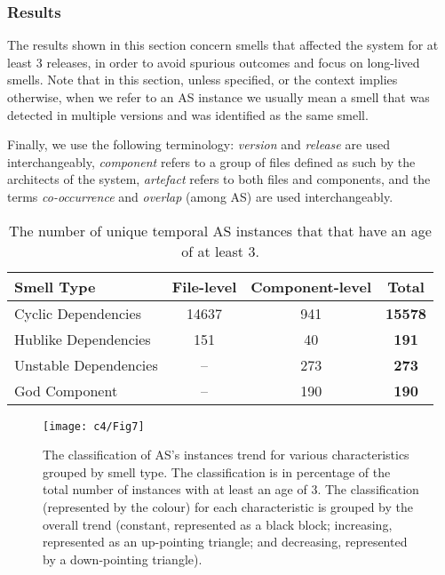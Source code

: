 \subsubsection{Results}\label{c4:sec:results-rq1.1}
The results shown in this section concern smells that affected the system for at least 3 releases, in order to avoid spurious outcomes and focus on long-lived smells. Note that in this section, unless specified, or the context implies otherwise, when we refer to an AS instance we usually mean a smell that was detected in multiple versions and was identified as the same smell.

Finally, we use the following terminology: \emph{version} and \emph{release} are used interchangeably, \emph{component} refers to a group of files defined as such by the architects of the system, \emph{artefact} refers to both files and components, and the terms \emph{co-occurrence} and \emph{overlap} (among AS) are used interchangeably.

\begin{table}[tbp]
    \centering
    \caption{The number of unique temporal AS instances that that have an age of at least 3.}
    \label{c4:tab:smell-count}
    \begin{tabular}{@{}lcc|c@{}}
    \toprule
    \textbf{Smell Type} & \textbf{File-level} & \textbf{Component-level} & \textbf{Total} \\ \midrule
    Cyclic Dependencies & 14637 & 941 & \textbf{15578} \\
    Hublike Dependencies & 151 & 40 & \textbf{191} \\
    Unstable Dependencies & -- & 273 & \textbf{273} \\
    God Component & -- & 190 & \textbf{190} \\ \bottomrule
    \end{tabular}
\end{table}

\begin{figure}[h]
    \centering
    \texttt{[image: c4/Fig7]}
    \caption{The classification of AS's instances trend for various characteristics grouped by smell type. The classification is in percentage of the total number of instances with at least an age of 3. The classification (represented by the colour) for each characteristic is grouped by the overall trend (constant, represented as a black block; increasing, represented as an up-pointing triangle; and decreasing, represented by a down-pointing triangle).}\label{c4:fig:dtw-classification}
\end{figure}

